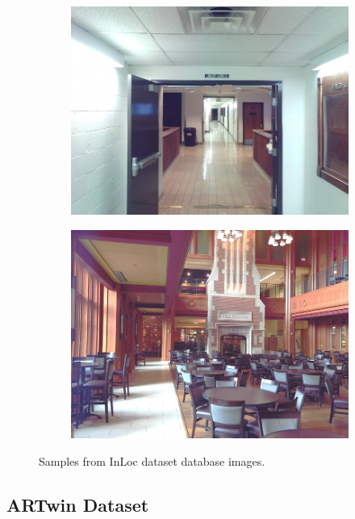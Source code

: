 \begin{figure}
    \centering
    \begin{subfigure}{.5\textwidth}
        \centering
        \includegraphics[width=.9\textwidth]{../graphics/cse_cutout_000_90_0.jpg}
    \end{subfigure}%
    \begin{subfigure}{.5\textwidth}
        \centering
        \includegraphics[width=.9\textwidth]{../graphics/DUC_cutout_003_0_0.jpg}
    \end{subfigure}
    \caption[Samples from InLoc dataset database images]{Samples from InLoc dataset database images.}\label{fig:inloc_dataset}
\end{figure}

\subsection{ARTwin Dataset}


